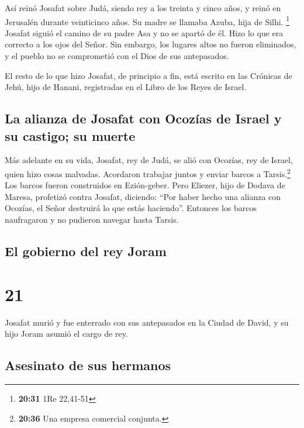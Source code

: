  Así reinó Josafat sobre Judá, siendo rey a los treinta y
cinco años, y reinó en Jerusalén durante veinticinco años. Su madre se
llamaba Azuba, hija de Silhi. \footnote{\textbf{20:31} 1Re 22,41-51}
 Josafat siguió el camino de su padre Asa y no se apartó
de él. Hizo lo que era correcto a los ojos del Señor. 
Sin embargo, los lugares altos no fueron eliminados, y el pueblo no se
comprometió con el Dios de sus antepasados.

 El resto de lo que hizo Josafat, de principio a fin,
está escrito en las Crónicas de Jehú, hijo de Hanani, registradas en el
Libro de los Reyes de Israel.

\hypertarget{la-alianza-de-josafat-con-ocozuxedas-de-israel-y-su-castigo-su-muerte}{%
\subsection{La alianza de Josafat con Ocozías de Israel y su castigo; su
muerte}\label{la-alianza-de-josafat-con-ocozuxedas-de-israel-y-su-castigo-su-muerte}}

 Más adelante en su vida, Josafat, rey de Judá, se alió
con Ocozías, rey de Israel, quien hizo cosas malvadas. 
Acordaron trabajar juntos y enviar barcos a Tarsis.\footnote{\textbf{20:36}
  Una empresa comercial conjunta.} Los barcos fueron construidos en
Ezión-geber.  Pero Eliezer, hijo de Dodava de Maresa,
profetizó contra Josafat, diciendo: ``Por haber hecho una alianza con
Ocozías, el Señor destruirá lo que estás haciendo''. Entonces los barcos
naufragaron y no pudieron navegar hasta Tarsis.

\hypertarget{el-gobierno-del-rey-joram}{%
\subsection{El gobierno del rey Joram}\label{el-gobierno-del-rey-joram}}

\hypertarget{section-20}{%
\section{21}\label{section-20}}

 Josafat murió y fue enterrado con sus antepasados en la
Ciudad de David, y su hijo Joram asumió el cargo de rey.

\hypertarget{asesinato-de-sus-hermanos}{%
\subsection{Asesinato de sus hermanos}\label{asesinato-de-sus-hermanos}}

